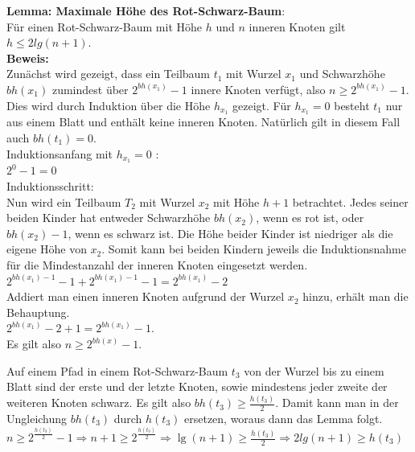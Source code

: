 \documentclass[a4paper,12pt]{article}
\begin{document}
\noindent\textbf{Lemma: Maximale Höhe des Rot-Schwarz-Baum}:\\
Für einen Rot-Schwarz-Baum mit Höhe $h$ und $n$ inneren Knoten gilt $h \leq  2 lg(n + 1)$. \\
\noindent\textbf{Beweis:}\\
Zunächst wird gezeigt, dass ein Teilbaum $t_1$ mit Wurzel $x_1$ und Schwarzhöhe $\mathit{bh(x_1)}$ zumindest über $2^{bh(x_1)} - 1$ innere Knoten verfügt, also $n \geq 2^{bh(x_1)} - 1 $. Dies wird durch Induktion über die Höhe $\mathit{h_{x_1}}$ gezeigt. Für $\mathit{h_{x_1}} = 0$ besteht $t_1$ nur aus einem Blatt und enthält keine inneren Knoten. Natürlich gilt in diesem Fall auch $\mathit{bh(t_1) = 0}$.  \\
Induktionsanfang mit $\mathit{h_{x_1} = 0}$ :\\
$2^{0} - 1 = 0$\\
Induktionsschritt:\\
Nun wird ein Teilbaum $T_2$ mit Wurzel $x_2$ mit Höhe $h + 1$ betrachtet. Jedes seiner beiden Kinder hat entweder Schwarzhöhe  $\mathit{bh(x_2)}$, wenn es rot ist, oder $\mathit{bh(x_2) - 1}$, wenn es schwarz ist. Die Höhe beider Kinder ist niedriger als die eigene Höhe von $x_2$. Somit kann bei beiden Kindern jeweils die Induktionsnahme für die Mindestanzahl der inneren Knoten eingesetzt werden.   \\
$2^{bh(x_1)-1} - 1 + 2^{bh(x_1)-1} - 1  = 2^{bh(x_1)} - 2 $ \\
Addiert man einen inneren Knoten aufgrund der Wurzel $x_2$ hinzu, erhält man die Behauptung.\\
$2^{bh(x_1)} - 2 + 1 = 2^{bh(x_1)} - 1 $.\\
Es gilt also $n \geq 2^{\mathit{bh(x)}} - 1$.

\noindent Auf einem Pfad in einem Rot-Schwarz-Baum $t_3$ von der Wurzel bis zu einem Blatt sind der erste und der letzte Knoten, sowie mindestens jeder zweite der weiteren Knoten schwarz. Es gilt also $\mathit{bh(t_3)} \geq \frac{h(t_3)}{2}$. 
Damit kann man in der Ungleichung $\mathit{bh(t_3)}$ durch $\mathit{h(t_3)}$ ersetzen, woraus dann das Lemma folgt.\\
$n \geq 2^{\frac{\mathit{h(t_3)}}{2}} - 1 \Rightarrow n + 1 \geq 2^{\frac{\mathit{h(t_3)}}{2}} \Rightarrow
\lg(n + 1) \geq \frac{h(t_3)}{2} \Rightarrow 2 lg(n + 1) \geq h(t_3) $ 



\newpage


\end{document}
